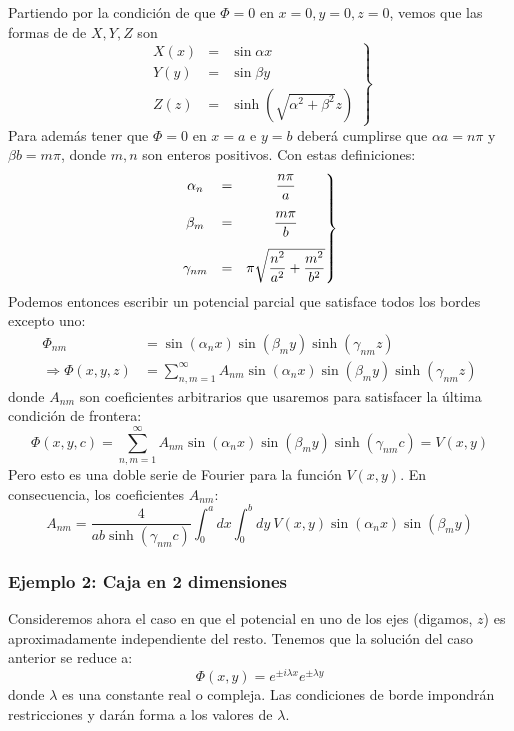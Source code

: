 \documentclass[]{article}
\numberwithin{equation}{section}
\begin{document}
Partiendo por la condición de que \(\Phi=0\) en \(x=0, y=0, z=0\), vemos que las formas de de \(X,Y,Z\) son
\begin{equation}
	\left. \begin{matrix}
		X(x) &=& \sin\alpha x\\
		Y(y) &=& \sin\beta y\\
		Z(z) &=& \sinh\left(\sqrt{\alpha^2 + \beta^2} z\right)
	\end{matrix}\right\rbrace 
\end{equation}
Para además tener que \(\Phi=0\) en \(x=a\) e \(y=b\) deberá cumplirse que \(\alpha a = n\pi\) y \(\beta b = m\pi\), donde \(m,n\) son enteros positivos. Con estas definiciones:
\begin{equation}
	\left. \begin{matrix}
		\alpha_n 	&=& \dfrac{n\pi}{a}\vspace{3mm}\\
		\beta_m 	&=& \dfrac{m\pi}{b}\vspace{3mm}\\
		\gamma_{nm} &=& \pi\sqrt{\dfrac{n^2}{a^2} + \dfrac{m^2}{b^2}}
	\end{matrix}\right\rbrace 
\end{equation}
Podemos entonces escribir un potencial parcial que satisface todos los bordes excepto uno:
\begin{align}
	\Phi_{nm} &= \sin\left(\alpha_n x\right) \sin\left(\beta_m y\right) \sinh\left(\gamma_{nm} z\right)\\
	\Rightarrow \Phi(x,y,z) &= \sum_{n,m=1}^{\infty}A_{nm} \sin\left(\alpha_n x\right) \sin\left(\beta_m y\right) \sinh\left(\gamma_{nm} z\right)
\end{align}
donde \(A_{nm}\) son coeficientes arbitrarios que usaremos para satisfacer la última condición de frontera:
\begin{equation}
	\Phi(x,y,c) = \sum_{n,m=1}^{\infty}A_{nm} \sin\left(\alpha_n x\right) \sin\left(\beta_m y\right) \sinh\left(\gamma_{nm} c\right) = V(x,y)
\end{equation}
Pero esto es una doble serie de Fourier para la función \(V(x,y)\). En consecuencia, los coeficientes \(A_{nm}\):
\begin{equation}
	A_{nm} = \frac{4}{a b \sinh\left(\gamma_{nm} c\right)}\int_{0}^{a}dx \int_{0}^{b}dy ~V(x,y) \sin\left(\alpha_n x\right) \sin\left(\beta_m y\right)
\end{equation}

\subsubsection{Ejemplo 2: Caja en 2 dimensiones}
Consideremos ahora el caso en que el potencial en uno de los ejes (digamos, \(z\)) es aproximadamente independiente del resto. Tenemos que la solución del caso anterior se reduce a:
\begin{equation}
	\Phi(x,y) = e^{\pm i \lambda x} e^{\pm \lambda y}
\end{equation}
donde \(\lambda\) es una constante real o compleja. Las condiciones de borde impondrán restricciones y darán forma a los valores de \(\lambda\).
\end{document}
